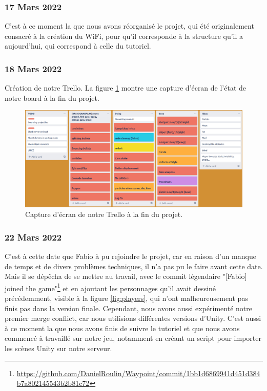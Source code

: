 \documentclass[a4paper]{article}
\begin{document}
\subsubsection{17 Mars 2022}
C'est à ce moment la que nous avons réorganisé le projet, qui été originalement consacré à la création du WiFi, pour qu'il corresponde à la structure qu'il a aujourd'hui, qui correspond à celle du tutoriel. 

\subsubsection{18 Mars 2022}
Création de notre Trello\cite{trello}. La figure \ref{fig:trello} montre une capture d'écran de l'état de notre board à la fin du projet.
\begin{figure}[h]
    \centering
    \includegraphics[width=\textwidth]{images/trello.png}
    \caption{Capture d'écran de notre Trello à la fin du projet.}
    \label{fig:trello}
\end{figure}

\subsubsection{22 Mars 2022}
C'est à cette date que Fabio à pu rejoindre le projet, car en raison d'un manque de temps et de divers problèmes techniques, il n'a pas pu le faire avant cette date. Mais il se dépêcha de se mettre au travail, avec le commit légendaire "[Fabio] joined the game"\footnote{\url{https://github.com/DanielRoulin/Waypoint/commit/1bb1d6869941d451d384b7a802145543b2b81c72}} et en ajoutant les personnages qu'il avait dessiné précédemment, visible à la figure \ref{fig:players}, qui n'ont malheureusement pas finis pas dans la version finale. Cependant, nous avons aussi expérimenté notre premier merge conflict, car nous utilisions différentes versions d'Unity. C'est aussi à ce moment la que nous avons finis de suivre le tutoriel et que nous avons commencé à travaillé sur notre jeu, notamment en créant un script pour importer les scènes Unity sur notre serveur.
\end{document}
